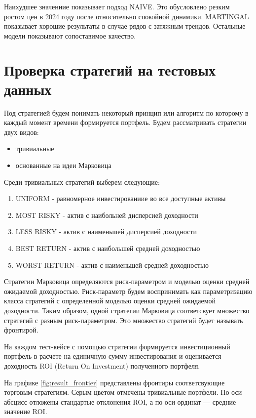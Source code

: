 

Наихудшее значениие показывает подход NAIVE.
Это обусловлено резким ростом цен в 2024 году после относительно спокойной динамики.
MARTINGAL показывает хорошие результаты в случае рядов с затяжным трендов.
Остальные модели показывают сопоставимое качество.

\section{Проверка стратегий на тестовых данных}

Под стратегией будем понимать некоторый принцип или алгоритм по которому в каждый момент времени
формируется портфель.
Будем рассматривать стратегии двух видов:
\begin{itemize}
	\item тривиальные 
	\item основанные на идеи Марковица
\end{itemize}

Среди тривиальных стратегий выберем следующие:
\begin{enumerate}
	\item UNIFORM - равномерное инвестированиие во все доступные активы
	\item MOST RISKY - актив с наибольней дисперсией доходности
	\item LESS RISKY - актив с наименьшей дисперсией доходности
	\item BEST RETURN - актив с наибольшей средней доходностью
	\item WORST RETURN - актив с наименьшей средней доходностью
\end{enumerate}

Стратегии Марковица определяются риск-параметром и моделью оценки средней ожидаемой доходностью.
Риск-параметр будем воспринимать как параметризацию класса стратегий с определенной моделью оценки средней ожидаемой доходности.
Таким образом, одной стратегии Марковица соответсвует множество стратегий с разным риск-параметром. 
Это множество стратегий будет называть фронтирой.

На каждом тест-кейсе с помощью стратегии формируется инвестиционный портфель
в расчете на единичную сумму инвестирования и оценивается доходность ROI (Return On Investment) полученного портфеля.

На графике \ref{fig:result_frontier} представлены фронтиры соответсвующие торговым стратегиям.
Серым цветом отмечены тривиальные портфели.
По оси абсцисс отложены стандартые отклонения ROI, а по оси ординат --- средние значение ROI.

